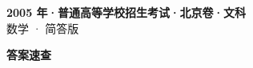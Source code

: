 \documentclass[zihao=-4, a4paper]{ctexart}
\begin{document}
\begin{center}
  {\Large\bfseries 2005 年·普通高等学校招生考试·北京卷·文科}\\[4pt]
  {\large 数学 · 简答版}
\end{center}
\medskip
{}

\clearpage
{}
\begin{center}{\Large\bfseries 答案速查}\end{center}
\medskip

\end{document}

